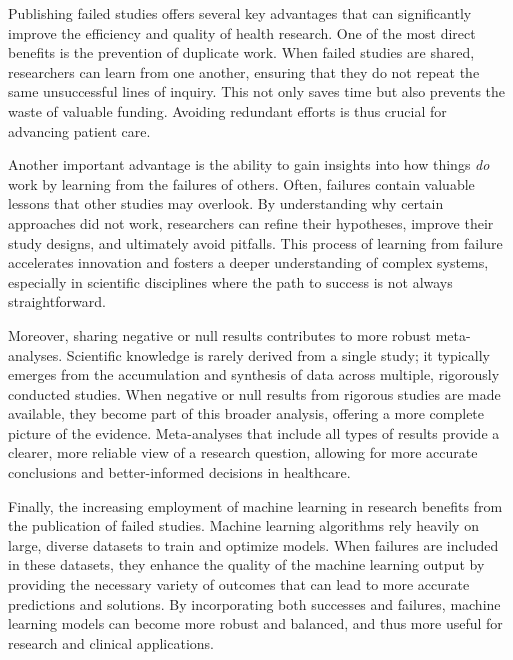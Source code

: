 \documentclass[authordate, empirical]{jote-new-article}
\begin{document}
	Publishing failed studies offers several key advantages that can significantly improve the efficiency and quality of health research. One of the most direct benefits is the prevention of duplicate work. When failed studies are shared, researchers can learn from one another, ensuring that they do not repeat the same unsuccessful lines of inquiry. This not only saves time but also prevents the waste of valuable funding. Avoiding redundant efforts is thus crucial for advancing patient care.



	Another important advantage is the ability to gain insights into how things \emph{do} work by learning from the failures of others. Often, failures contain valuable lessons that other studies may overlook. By understanding why certain approaches did not work, researchers can refine their hypotheses, improve their study designs, and ultimately avoid pitfalls. This process of learning from failure accelerates innovation and fosters a deeper understanding of complex systems, especially in scientific disciplines where the path to success is not always straightforward.



	Moreover, sharing negative or null results contributes to more robust meta-analyses. Scientific knowledge is rarely derived from a single study; it typically emerges from the accumulation and synthesis of data across multiple, rigorously conducted studies. When negative or null results from rigorous studies are made available, they become part of this broader analysis, offering a more complete picture of the evidence. Meta-analyses that include all types of results provide a clearer, more reliable view of a research question, allowing for more accurate conclusions and better-informed decisions in healthcare.



	Finally, the increasing employment of machine learning in research benefits from the publication of failed studies. Machine learning algorithms rely heavily on large, diverse datasets to train and optimize models. When failures are included in these datasets, they enhance the quality of the machine learning output by providing the necessary variety of outcomes that can lead to more accurate predictions and solutions. By incorporating both successes and failures, machine learning models can become more robust and balanced, and thus more useful for research and clinical applications.
\end{document}
